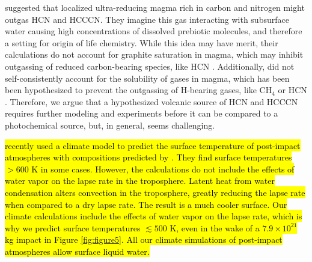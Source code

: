 \citet{Rimmer_2019b} suggested that localized ultra-reducing magma rich in carbon and nitrogen might outgas HCN and HCCCN. They imagine this gas interacting with subsurface water causing high concentrations of dissolved prebiotic molecules, and therefore a setting for origin of life chemistry. While this idea may have merit, their calculations do not account for graphite saturation in magma, which may inhibit outgassing of reduced carbon-bearing species, like HCN \citep{Hirschmann_2008,Wogan_2020,Thompson_2022}. Additionally, \citet{Rimmer_2019b} did not self-consistently account for the solubility of gases in magma, which has been been hypothesized to prevent the outgassing of H-bearing gases, like CH$_4$ or HCN \citep{Wogan_2020}. Therefore, we argue that a hypothesized volcanic source of HCN and HCCCN requires further modeling and experiments before it can be compared to a photochemical source, but, in general, seems challenging.

\hl{\mbox{\citet{Cerrillo_2022}} recently used a climate model to predict the surface temperature of post-impact atmospheres with compositions predicted by \mbox{\citet{Zahnle_2020}}. They find surface temperatures $> 600$ K in some cases. However, the \mbox{\citet{Cerrillo_2022}} calculations do not include the effects of water vapor on the lapse rate in the troposphere. Latent heat from water condensation alters convection in the troposphere, greatly reducing the lapse rate when compared to a dry lapse rate. The result is a much cooler surface. Our climate calculations include the effects of water vapor on the lapse rate, which is why we predict surface temperatures $\lesssim 500$ K, even in the wake of a $7.9 \times 10^{21}$ kg impact in Figure \mbox{\ref{fig:figure5}}. All our climate simulations of post-impact atmospheres allow surface liquid water.}

